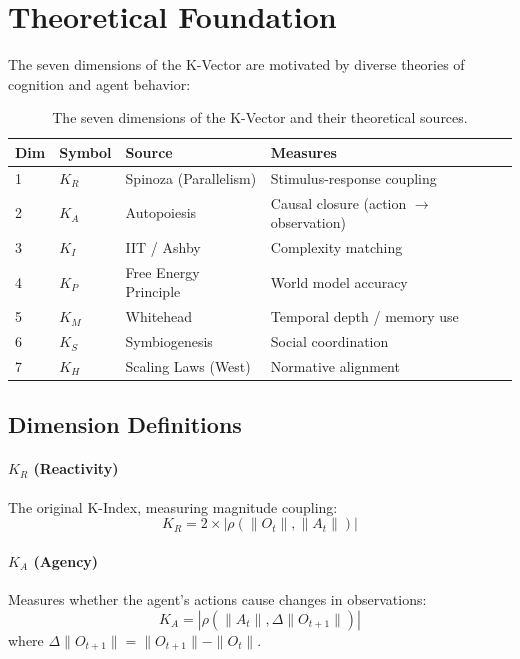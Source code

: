 \documentclass[11pt,a4paper]{article}
\newcommand{\kr}{K_R}
\newcommand{\ka}{K_A}
\newcommand{\ki}{K_I}
\newcommand{\kp}{K_P}
\newcommand{\km}{K_M}
\newcommand{\ks}{K_S}
\newcommand{\kh}{K_H}
\begin{document}
\section{Theoretical Foundation}

The seven dimensions of the K-Vector are motivated by diverse theories of cognition and agent behavior:

\begin{table}[h]
\centering
\begin{tabular}{lllp{5cm}}
\toprule
\textbf{Dim} & \textbf{Symbol} & \textbf{Source} & \textbf{Measures} \\
\midrule
1 & $\kr$ & Spinoza (Parallelism) & Stimulus-response coupling \\
2 & $\ka$ & Autopoiesis & Causal closure (action $\to$ observation) \\
3 & $\ki$ & IIT / Ashby & Complexity matching \\
4 & $\kp$ & Free Energy Principle & World model accuracy \\
5 & $\km$ & Whitehead & Temporal depth / memory use \\
6 & $\ks$ & Symbiogenesis & Social coordination \\
7 & $\kh$ & Scaling Laws (West) & Normative alignment \\
\bottomrule
\end{tabular}
\caption{The seven dimensions of the K-Vector and their theoretical sources.}
\label{tab:dimensions}
\end{table}

\subsection{Dimension Definitions}

\paragraph{$\kr$ (Reactivity)} The original K-Index, measuring magnitude coupling:
\begin{equation}
\kr = 2 \times |\rho(\|O_t\|, \|A_t\|)|
\end{equation}

\paragraph{$\ka$ (Agency)} Measures whether the agent's actions cause changes in observations:
\begin{equation}
\ka = |\rho(\|A_t\|, \Delta\|O_{t+1}\|)|
\end{equation}
where $\Delta\|O_{t+1}\| = \|O_{t+1}\| - \|O_t\|$.
\end{document}
